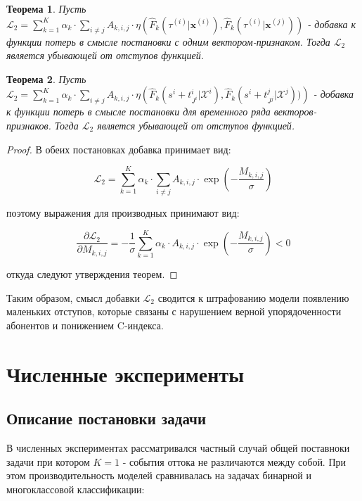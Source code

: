 \documentclass[a4paper,14pt,oneside,openany]{memoir}
\newtheorem{theorem}{Теорема}
\begin{document}
\begin{theorem}
	Пусть $\mathcal{L}_2 =\sum_{k=1}^K\alpha_k\cdot\sum_{i\neq j}A_{k,i,j}\cdot\eta\left(\hat{F}_k(\tau^{(i)}|\mathbf{x}^{(i)}),\hat{F}_k(\tau^{(i)}|\mathbf{x}^{(j)})\right)$ - добавка к функции потерь в смысле постановки с одним вектором-признаком. Тогда $\mathcal{L}_2$ является убывающей от отступов функцией.  
\end{theorem}

\begin{theorem}
	Пусть $\mathcal{L}_2 =\sum_{k=1}^K\alpha_k\cdot\sum_{i\neq j}A_{k,i,j}\cdot\eta\left(\hat{F}_k(s^i+t_{J^i}^i|\mathcal{X}^i) , \hat{F}_k(s^i+t_{J^j}^j|\mathcal{X}^j))\right)$ - добавка к функции потерь в смысле постановки для временного ряда векторов-признаков. Тогда $\mathcal{L}_2$ является убывающей от отступов функцией.  
\end{theorem}

\begin{proof}
	В обеих постановках добавка принимает вид: 
	
	$$\mathcal{L}_2 =\sum_{k=1}^K\alpha_k\cdot\sum_{i\neq j}A_{k,i,j}\cdot\exp\left(-\frac{M_{k,i,j}}{\sigma}\right)$$
	
	поэтому выражения для производных принимают вид: 
	
	$$ 
	\frac{\partial \mathcal{L}_2}{\partial M_{k,i,j}} = 
	-\frac{1}{\sigma} \sum_{k=1}^K\alpha_k\cdot A_{k,i,j}\cdot\exp\left(-\frac{M_{k,i,j}}{\sigma}\right) < 0
	 $$
	
	откуда следуют утверждения теорем.
\end{proof}


Таким образом, смысл добавки $\mathcal{L}_2$ сводится к штрафованию модели появлению маленьких отступов, которые связаны с нарушением верной упорядоченности абонентов и понижением C-индекса. 


\chapter{Численные эксперименты}

\section{Описание постановки задачи}

В численных экспериментах рассматривался частный случай общей поставноки задачи при котором $K = 1$ - события оттока не различаются между собой. При этом производительность моделей сравнивалась на задачах бинарной и многоклассовой классификации: 
\end{document}
